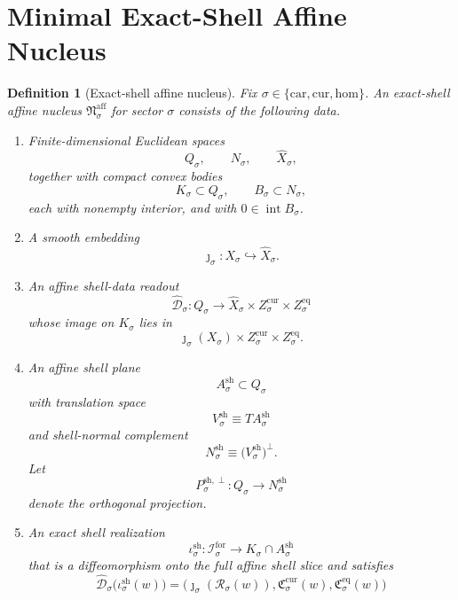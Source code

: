 \documentclass[11pt]{article}
\newcommand{\Car}{\mathrm{car}}
\newcommand{\Cur}{\mathrm{cur}}
\newcommand{\Hom}{\mathrm{hom}}
\newcommand{\ForSpace}[1]{\mathcal I_{#1}^{\mathrm{for}}}
\newcommand{\Reduction}[1]{\mathcal R_{#1}}
\newcommand{\CurrentCarrier}[1]{\mathfrak C_{#1}^{\mathrm{cur}}}
\newcommand{\EqCarrier}[1]{\mathfrak C_{#1}^{\mathrm{eq}}}
\newcommand{\CoordSpace}[1]{Q_{#1}}
\newcommand{\CoordBody}[1]{K_{#1}}
\newcommand{\NormalSpace}[1]{N_{#1}}
\newcommand{\NormalBody}[1]{B_{#1}}
\newcommand{\VisibleAffine}[1]{\widehat X_{#1}}
\newcommand{\AffineData}[1]{\widehat{\mathcal D}_{#1}}
\newcommand{\ShellAffine}[1]{A_{#1}^{\mathrm{sh}}}
\newcommand{\ShellDir}[1]{V_{#1}^{\mathrm{sh}}}
\newcommand{\ShellNormal}[1]{N_{#1}^{\mathrm{sh}}}
\newcommand{\ShellProj}[1]{P_{#1}^{\mathrm{sh},\perp}}
\newcommand{\ShellEmbed}[1]{\iota_{#1}^{\mathrm{sh}}}
\newcommand{\AffineNucleus}[1]{\mathfrak N_{#1}^{\mathrm{aff}}}
\newtheorem{definition}{Definition}
\begin{document}
\section{Minimal Exact-Shell Affine Nucleus}

\begin{definition}[Exact-shell affine nucleus]
\label{def:nucleus}
Fix \(\sigma\in\{\Car,\Cur,\Hom\}\). An \emph{exact-shell affine nucleus} \(\AffineNucleus{\sigma}\) for sector \(\sigma\) consists of the following data.
\begin{enumerate}
    \item Finite-dimensional Euclidean spaces
    \[
    \CoordSpace{\sigma},
    \qquad
    \NormalSpace{\sigma},
    \qquad
    \VisibleAffine{\sigma},
    \]
    together with compact convex bodies
    \[
    \CoordBody{\sigma}\subset\CoordSpace{\sigma},
    \qquad
    \NormalBody{\sigma}\subset\NormalSpace{\sigma},
    \]
    each with nonempty interior, and with \(0\in\operatorname{int}\NormalBody{\sigma}\).
    \item A smooth embedding
    \[
    \jmath_{\sigma}:X_{\sigma}\hookrightarrow \VisibleAffine{\sigma}.
    \]
    \item An affine shell-data readout
    \[
    \AffineData{\sigma}:\CoordSpace{\sigma}\to
    \VisibleAffine{\sigma}\times Z_{\sigma}^{\mathrm{cur}}\times Z_{\sigma}^{\mathrm{eq}}
    \]
    whose image on \(\CoordBody{\sigma}\) lies in
    \[
    \jmath_{\sigma}(X_{\sigma})\times Z_{\sigma}^{\mathrm{cur}}\times Z_{\sigma}^{\mathrm{eq}}.
    \]
    \item An affine shell plane
    \[
    \ShellAffine{\sigma}\subset\CoordSpace{\sigma}
    \]
    with translation space
    \[
    \ShellDir{\sigma}\equiv T\ShellAffine{\sigma}
    \]
    and shell-normal complement
    \[
    \ShellNormal{\sigma}\equiv \bigl(\ShellDir{\sigma}\bigr)^{\perp}.
    \]
    Let
    \[
    \ShellProj{\sigma}:\CoordSpace{\sigma}\to\ShellNormal{\sigma}
    \]
    denote the orthogonal projection.
    \item An exact shell realization
    \[
    \ShellEmbed{\sigma}:\ForSpace{\sigma}\to
    \CoordBody{\sigma}\cap \ShellAffine{\sigma}
    \]
    that is a diffeomorphism onto the full affine shell slice and satisfies
    \begin{equation}
    \AffineData{\sigma}\bigl(\ShellEmbed{\sigma}(w)\bigr)
    =
    \bigl(
    \jmath_{\sigma}(\Reduction{\sigma}(w)),
    \CurrentCarrier{\sigma}(w),
    \EqCarrier{\sigma}(w)
    \bigr)
    \label{eq:nucleuscompat}
    \end{equation}

\end{enumerate}
\end{definition}
\end{document}
